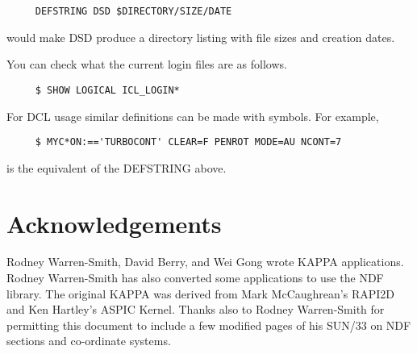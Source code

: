 {\small
\begin{verbatim}
     DEFSTRING DSD $DIRECTORY/SIZE/DATE
\end{verbatim}
\normalsize

would make DSD produce a directory listing with file sizes and
creation dates.

You can check what the current login files are as follows.

\small
\begin{verbatim}
     $ SHOW LOGICAL ICL_LOGIN*
\end{verbatim}
\normalsize

For DCL usage similar definitions can be made with symbols. For
example, 
 
\small
\begin{verbatim}
     $ MYC*ON:=='TURBOCONT' CLEAR=F PENROT MODE=AU NCONT=7
\end{verbatim}
\normalsize
 
is the equivalent of the DEFSTRING above.

\section{Acknowledgements}

Rodney Warren-Smith, David Berry, and Wei Gong wrote {\small KAPPA}
applications.  Rodney Warren-Smith has also converted some applications
to use the NDF library. The original {\small KAPPA} was derived from
Mark McCaughrean's {\small RAPI2D} and Ken Hartley's ASPIC {\small
Kernel}.  Thanks also to Rodney Warren-Smith for permitting this
document to include a few modified pages of his SUN/33 on NDF sections
and co-ordinate systems. 

\newpage
\appendix
\begin{small}

\end{small}}
